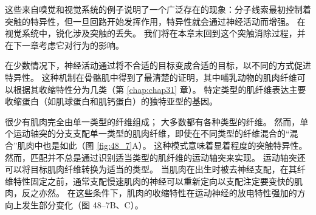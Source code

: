 这些来自嗅觉和视觉系统的例子说明了一个广泛存在的现象：分子线索最初控制着突触的特异性，但一旦回路开始发挥作用，特异性就会通过神经活动而增强。 在视觉系统中，锐化涉及突触的丢失。 我们将在本章末回到这个突触消除过程，并在下一章考虑它对行为的影响。

在少数情况下，神经活动通过将不合适的目标变成合适的目标，以不同的方式促进特异性。 这种机制在骨骼肌中得到了最清楚的证明，其中哺乳动物的肌肉纤维可以根据其收缩特性分为几类（第 \ref{chap:chap31} 章）。 特定类型的肌纤维表达主要收缩蛋白（如肌球蛋白和肌钙蛋白）的独特亚型的基因。

很少有肌肉完全由单一类型的纤维组成； 大多数都有各种类型的纤维。 
然而，单个运动轴突的分支支配单一类型的肌肉纤维，即使在不同类型的纤维混合的“混合”肌肉中也是如此（图 \ref{fig:48_7}A）。 
这种模式意味着显着程度的突触特异性。 然而，匹配并不总是通过识别适当类型的肌纤维的运动轴突来实现。 运动轴突还可以将目标肌肉纤维转换为适当的类型。 当肌肉在出生时被去神经支配，在其纤维特性固定之前，通常支配慢速肌肉的神经可以重新定向以支配注定要变快的肌肉，反之亦然。 在这些条件下，肌肉的收缩特性在运动神经的放电特性强加的方向上发生部分变化（图 48–7B、C）。

